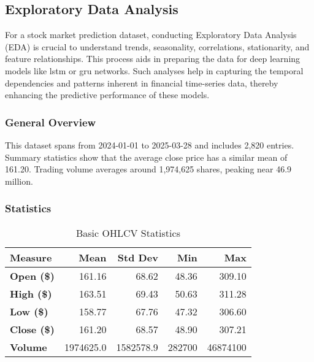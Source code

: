 \clearpage
\subsection{Exploratory Data Analysis}
\label{app:eda}

For a stock market prediction dataset, conducting Exploratory Data Analysis (EDA) is crucial
to understand trends, seasonality, correlations, stationarity, and feature relationships. 
This process aids in preparing the data for deep learning models like \acrshort{lstm}
or \acrshort{gru} networks. Such analyses help in capturing the temporal dependencies and
patterns inherent in financial time-series data, thereby enhancing the predictive
performance of these models. 


\subsubsection{General Overview}
This dataset spans from 2024-01-01 to 2025-03-28 and includes 2,820 entries. 
Summary statistics show that the average close price has a similar mean of 
161.20. Trading volume averages around 1,974,625 shares, 
peaking near 46.9 million.

\subsubsection{Statistics}

\begin{table}[H]
\centering
\caption{Basic OHLCV Statistics}
\label{tab:ohlcv-stats}
\begin{tabular}{lrrrr}
\hline
\textbf{Measure} & \textbf{Mean} & \textbf{Std Dev} & \textbf{Min} & \textbf{Max}\\
\hline\hline
\textbf{Open (\$)}  & 161.16 & 68.62  & 48.36   & 309.10   \\
\textbf{High (\$)}  & 163.51 & 69.43  & 50.63   & 311.28   \\
\textbf{Low (\$)}   & 158.77 & 67.76  & 47.32   & 306.60   \\
\textbf{Close (\$)} & 161.20 & 68.57  & 48.90   & 307.21   \\
\textbf{Volume}     & 1974625.0 & 1582578.9 & 282700  & 46874100 \\
\hline
\end{tabular}
\end{table}

